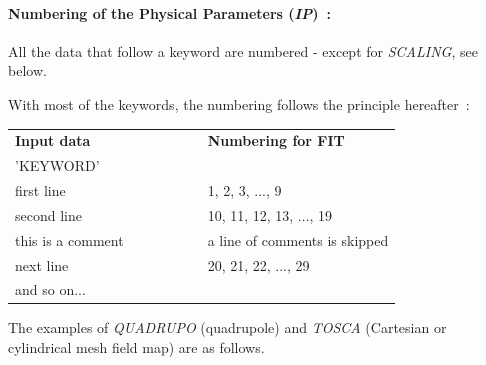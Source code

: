 \paragraph{Numbering of the Physical Parameters (\textsl{IP})~: }

\noindent All the data that follow a keyword are numbered -  except for \textsl{SCALING}, see below. 

\noindent With most of the keywords, the numbering follows the principle hereafter~: 
\begin{center}
{\renewcommand{\arraystretch}{1}
	\begin{tabular}{lcl}
	\textbf{Input  data}  &~~~~~~~~&  \textbf{Numbering  for  FIT}\\[1ex]
	'KEYWORD'      &&  \\
	first line   && 1, 2, 3, ..., 9 \\
	second  line &&  10, 11, 12, 13, ..., 19 \\
	this  is  a  comment &&  a line of comments is skipped\\
	next line    && 20, 21, 22, ..., 29  \\
	and  so  on... && 
	\end{tabular}    }
\end{center}

\noindent The examples of \textsl{QUADRUPO} (quadrupole) and 
\textsl{TOSCA} (Cartesian or cylindrical mesh field map) are as follows. 

